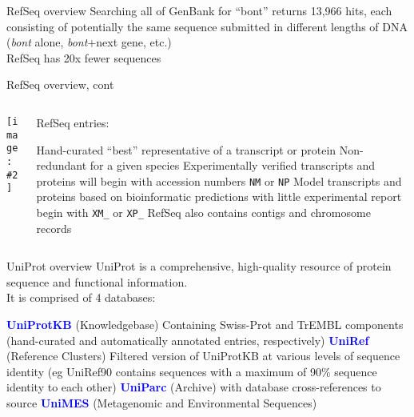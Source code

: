 \documentclass{beamer}
\renewcommand{\c}[1]{\begin{center}#1\end{center}}
\newcommand{\blu}[1]{\textcolor{blue}{\textbf{#1}}}
\newcommand{\gr}[2][.95]{\c{\texttt{[image: \#2]}}}
\begin{document}
\begin{frame}{RefSeq overview}
Searching all of GenBank for ``bont'' returns 13,966 hits, each consisting of potentially the same sequence submitted in different lengths of DNA (\textit{bont} alone, \textit{bont}+next gene, etc.)\\
\bigskip
RefSeq has 20x fewer sequences
\end{frame}

\begin{frame}{RefSeq overview, cont}
\begin{columns}
\begin{column}{0.5\textwidth}
    \gr{l2_figs/s29_refseq.png}
\end{column}
\begin{column}{0.5\textwidth}
    \footnotesize RefSeq entries:
    \begin{outline}
        \1 Hand-curated ``best'' representative of a transcript or protein
        \1 Non-redundant for a given species
        \1 Experimentally verified transcripts and proteins will begin with accession numbers \texttt{NM} or \texttt{NP}
        \1 Model transcripts and proteins based on bioinformatic predictions with little experimental report begin with \texttt{XM\_} or \texttt{XP\_}
        \1 RefSeq also contains contigs and chromosome records
    \end{outline}
\end{column}
\end{columns}
\end{frame}

\begin{frame}{UniProt overview}
UniProt is a comprehensive, high-quality resource of protein sequence and functional information.\\
\bigskip
It is comprised of 4 databases:\\

\begin{outline}[enumerate]
    \1 \blu{UniProtKB} (Knowledgebase)
        \2[] Containing Swiss-Prot and TrEMBL components (hand-curated and automatically annotated entries, respectively)
    \1 \blu{UniRef} (Reference Clusters)
        \2[] Filtered version of UniProtKB at various levels of sequence identity (eg UniRef90 contains sequences with a maximum of 90\% sequence identity to each other)
    \1 \blu{UniParc} (Archive)
        \2[] with database cross-references to source
    \1 \blu{UniMES} (Metagenomic and Environmental Sequences)
\end{outline}
\end{frame}
\end{document}
